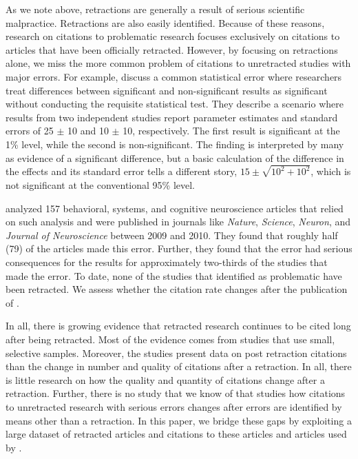 \documentclass[12pt, letterpaper]{article}
\begin{document}
As we note above, retractions are generally a result of serious scientific malpractice. Retractions are also easily identified. Because of these reasons, research on citations to problematic research focuses exclusively on citations to articles that have been officially retracted. However, by focusing on retractions alone, we miss the more common problem of citations to unretracted studies with major errors. For example, \citet{gelman2006} discuss a common statistical error where researchers treat differences between significant and non-significant results as significant without conducting the requisite statistical test. They describe a scenario where results from two independent studies report parameter estimates and standard errors of 25 $\pm$ 10 and 10 $\pm$ 10, respectively. The first result is significant at the 1\% level, while the second is non-significant. The finding is interpreted by many as evidence of a significant difference, but a basic calculation of the difference in the effects and its standard error tells a different story, $15 \pm \sqrt{10^{2} + 10^{2}}$, which is not significant at the conventional 95\% level.

\citet{nieuwenhuis2011} analyzed 157 behavioral, systems, and cognitive neuroscience articles that relied on such analysis and were published in journals like \textit{Nature}, \textit{Science}, \textit{Neuron}, and \textit{Journal of Neuroscience} between 2009 and 2010. They found that roughly half (79) of the articles made this error. Further, they found that the error had serious consequences for the results for approximately two-thirds of the studies that made the error. To date, none of the studies that \citet{nieuwenhuis2011} identified as problematic have been retracted. We assess whether the citation rate changes after the publication of \citet{nieuwenhuis2011}.

In all, there is growing evidence that retracted research continues to be cited long after being retracted. Most of the evidence comes from studies that use small, selective samples. Moreover, the studies present data on post retraction citations than the change in number and quality of citations after a retraction. In all, there is little research on how the quality and quantity of citations change after a retraction. Further, there is no study that we know of that studies how citations to unretracted research with serious errors changes after errors are identified by means other than a retraction. In this paper, we bridge these gaps by exploiting a large dataset of retracted articles and citations to these articles and articles used by \citet{nieuwenhuis2011}.
\end{document}
